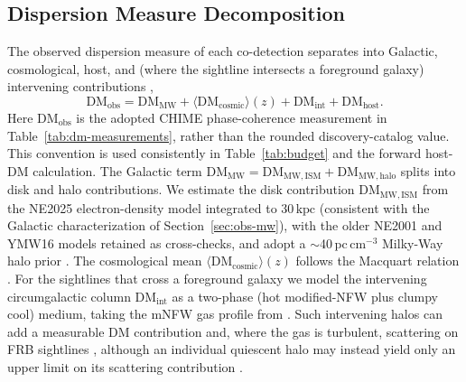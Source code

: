 %

\subsection{Dispersion Measure Decomposition}
\label{sec:dm}

The observed dispersion measure of each co-detection separates into Galactic,
cosmological, host, and (where the sightline intersects a foreground galaxy)
intervening contributions \citep{CordesChatterjee2019},
\begin{equation}
\mathrm{DM_{obs}} = \mathrm{DM_{MW}} + \langle\mathrm{DM_{cosmic}}\rangle(z)
+ \mathrm{DM_{int}} + \mathrm{DM_{host}}.
\label{eq:dmbudget}
\end{equation}
Here $\mathrm{DM_{obs}}$ is the adopted CHIME phase-coherence measurement in
Table~\ref{tab:dm-measurements}, rather than the rounded discovery-catalog
value. This convention is used consistently in Table~\ref{tab:budget} and the
forward host-DM calculation. The Galactic term
$\mathrm{DM_{MW}} = \mathrm{DM_{MW,ISM}} + \mathrm{DM_{MW,halo}}$ splits into
disk and halo contributions. We estimate the disk
contribution $\mathrm{DM_{MW,ISM}}$ from the NE2025 \citep{Ocker2026}
electron-density model integrated to $30\,\mathrm{kpc}$ (consistent with the
Galactic characterization of Section~\ref{sec:obs-mw}), with the older NE2001
\citep{CordesLazio2002} and YMW16 \citep{YMW2017} models retained as
cross-checks, and adopt a $\sim$40\,pc\,cm$^{-3}$ Milky-Way halo prior
\citep{YamasakiTotani2020}. The
cosmological mean $\langle\mathrm{DM_{cosmic}}\rangle(z)$ follows the Macquart
relation \citep{Macquart2020}. For the sightlines that cross a foreground
galaxy we model the intervening circumgalactic column $\mathrm{DM_{int}}$ as a
two-phase (hot modified-NFW plus clumpy cool) medium, taking the mNFW gas
profile from \citet{ProchaskaZheng2019}. Such intervening halos can add a
measurable DM contribution and, where the gas is turbulent, scattering on FRB
sightlines \citep{Ocker2021}, although an individual quiescent halo may instead
yield only an upper limit on its scattering contribution \citep{Prochaska2019}.

